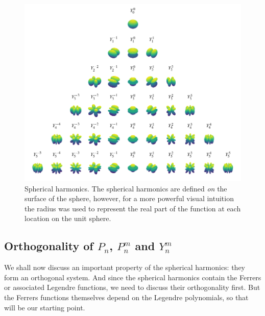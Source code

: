 \begin{figure}
  \centering
  \includegraphics[width=\linewidth]{papers/kugel/figures/python/spherical-harmonics-triangle}
  \caption{
    \label{kugel:fig:spherical-harmonics}
    Spherical harmonics. The spherical harmonics are defined \emph{on} the
    surface of the sphere, however, for a more powerful visual intuition the
    radius was used to represent the real part of the function at each location
    on the unit sphere. 
  }
\end{figure}


\subsection{Orthogonality of $P_n$, $P^m_n$ and $Y^m_n$}

We shall now discuss an important property of the spherical harmonics: they form
an orthogonal system. And since the spherical harmonics contain the Ferrers or
associated Legendre functions, we need to discuss their orthogonality first.
But the Ferrers functions themselves depend on the Legendre polynomials, so that
will be our starting point.

